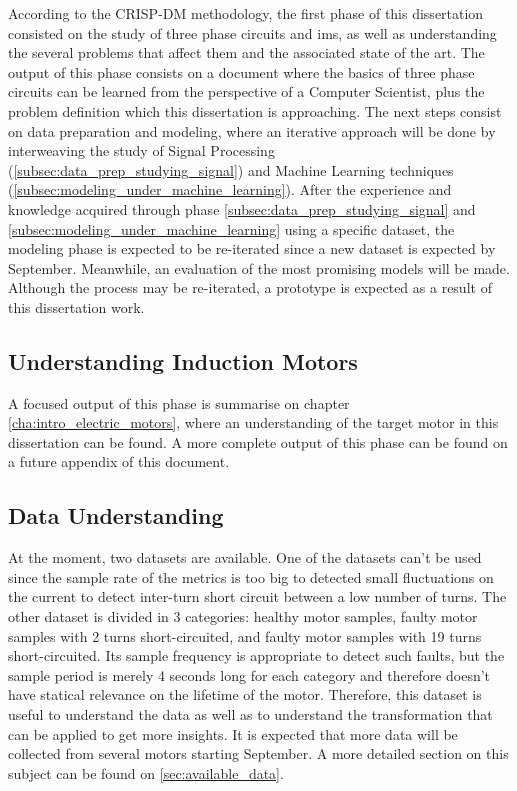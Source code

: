 According to the CRISP-DM methodology, the first phase of this dissertation consisted on the study of three phase circuits and \acrshort{ims}, as well as understanding the several problems that affect them and the associated state of the art. The output of this phase consists on a document where the basics of three phase circuits can be learned from the perspective of a Computer Scientist, plus the problem definition which this dissertation is approaching. The next steps consist on data preparation and modeling, where an iterative approach will be done by interweaving the study of Signal Processing (\ref{subsec:data_prep_studying_signal}) and Machine Learning techniques (\ref{subsec:modeling_under_machine_learning}). 
After the experience and knowledge acquired through phase \ref{subsec:data_prep_studying_signal} and \ref{subsec:modeling_under_machine_learning} using a specific dataset, the modeling phase is expected to be re-iterated since a new dataset is expected by September. Meanwhile, an evaluation of the most promising models will be made. Although the process may be re-iterated, a prototype is expected as a result of this dissertation work.


\subsection{Understanding Induction Motors}

A focused output of this phase is summarise on chapter \ref{cha:intro_electric_motors}, where an understanding of the target motor in this dissertation can be found. A more complete output of this phase can be found on a future appendix of this document.


\subsection{Data Understanding}

At the moment, two datasets are available. One of the datasets can't be used since the sample rate of the metrics is too big to detected small fluctuations on the current to detect inter-turn short circuit between a low number of turns.
The other dataset is divided in 3 categories: healthy motor samples, faulty motor samples with 2 turns short-circuited, and faulty motor samples with 19 turns short-circuited. Its sample frequency is appropriate to detect such faults, but the sample period is merely 4 seconds long for each category and therefore doesn't have statical relevance on the lifetime of the motor. Therefore, this dataset is useful to understand the data as well as to understand the transformation that can be applied to get more insights.
It is expected that more data will be collected from several motors starting September. A more detailed section on this subject can be found on \ref{sec:available_data}.

